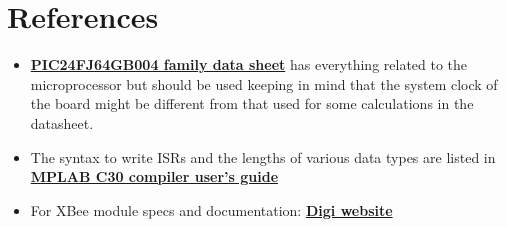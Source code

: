 \documentclass[aps,letterpaper,11pt]{article}
\begin{document}
\section{References}
\begin{itemize}
  \item \href{http://www.microchip.com.tw/Data_CD/Datasheet/16-Bits/39940C.pdf}{\textbf{PIC24FJ64GB004 family data sheet}}
  has everything related to the microprocessor but should be used keeping in mind that the system clock of the board might
  be different from that used for some calculations in the datasheet.
  \item The syntax to write ISRs and the lengths of various data types are listed
  in \href{http://ww1.microchip.com/downloads/en/devicedoc/c30_users_guide_51284f.pdf}{\textbf{MPLAB C30
  compiler user's guide}}
  \item For XBee module specs and documentation: \href{http://www.digi.com/products/wireless-wired-
  embedded-solutions/zigbee-rf-modules/zigbee-mesh-module/xbee-865lp}{\textbf{Digi website}}
\end{itemize}
\end{document}
